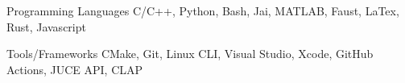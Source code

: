 

\begin{cvskills}

  \cvskill
    {Programming Languages} %
    {C/C++, Python, Bash, Jai, MATLAB, Faust, LaTex, Rust, Javascript} %

    \cvskill
    {Tools/Frameworks} %
    {CMake, Git, Linux CLI, Visual Studio, Xcode, GitHub Actions, JUCE API, CLAP} %


\end{cvskills}

